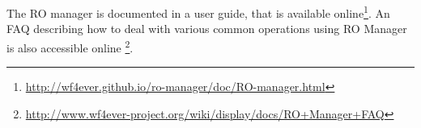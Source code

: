 





The RO manager is documented in a user guide, that is available online\footnote{\url{http://wf4ever.github.io/ro-manager/doc/RO-manager.html}}.  An FAQ describing how to deal with various common operations using RO Manager is also accessible online \footnote{\url{http://www.wf4ever-project.org/wiki/display/docs/RO+Manager+FAQ}}.



